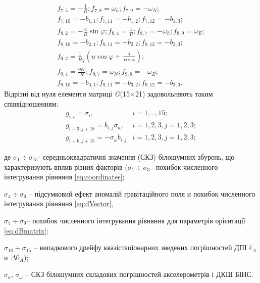 \begin{equation}
\begin{array}{l}
{f_{7,5}=-\frac{1}{R} ;f_{7,8}=\omega_{h}; f_{7,9}=-\omega_{N} ;}\\
{f_{7,10}=-b_{1,1};f_{7,11}=-b_{1,2};f_{7,12}=-b_{1,3} ;} \\
{f_{8,2} =-\frac{u}{R} \sin \varphi; f_{8,4} =\frac{1}{R};f_{8,7} =-\omega_{h};f_{8,9} =\omega_{E};}\\
{f_{8,10} =-b_{2,1}; f_{8,11} =-b_{2,2}; f_{8,12} =-b_{2,3} ;}\\ 
{f_{9,2} =\frac{1}{R}_{7} (u\cos \varphi +\frac{\dot{\lambda }}{\cos \varphi });}\\
{f_{9,4} =\frac{tg\varphi }{R}; f_{9,7} =\omega_{N}; f_{9,8} =-\omega_{E};}\\ 
{f_{9,10} =-b_{3,1};f_{9,11} =-b_{3,2};f_{9,12} =-b_{3,3}.}
\end{array}
\end{equation} 
Відрізні від нуля елементи матриці \textit{G}(15$\times $21) задовольняють таким 
співвідношенням:
\begin{equation} 
\label{eq:Gmatrix_} 
\begin{array}{cc} 
g_{i,i} =\sigma_{i},& i=1,..,15; \\ 
g_{i+3,j+18}=b_{i,j} \sigma_{a},& i=1,2,3,j=1,2,3;\\ 
g_{i+6,j+15}=-\sigma_{\omega } b_{i,j} & i=1,2,3,j=1,2,3; 
\end{array} 
\end{equation} 
\begin{ESKDexplanation}
\item де $\sigma_{1} \div \sigma_{15} $- середньоквадратичні значення (СКЗ) білошумних збурень, 
що характеризують вплив різних факторів ($\sigma_{1} \div \sigma_{3} $-- похибок 
численного інтегрування рівняння \eqref{eq:coordinates}; 
\item  $\sigma_{4} \div \sigma_{6} $ --  підсумковий ефект аномалій гравітаційного поля и похибок численного інтегрування 
рівняння \eqref{eq:dVector}, 
\item $\sigma_{7} \div \sigma_{9} $-- похибок численного інтегрування рівняння для параметрів орієнтації \eqref{eq:dBmatrix};  
\item $\sigma_{10} \div \sigma_{15} $ -- випадкового дрейфу квазістаціонарних зведених погрішностей 
ДПІ  $\bar{\varepsilon }_{A} $ и $\Delta \bar{0}_{A} $);
\item $\sigma_{a} $, $\sigma_{\omega } $ -- СКЗ білошумних складових погрішностей акселерометрів і ДКШ БІНС.
\end{ESKDexplanation}

